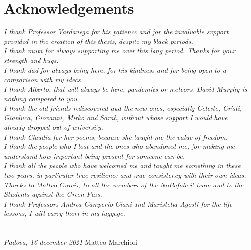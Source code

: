 \cleardoublepage
{}
{}
\chapter*{Acknowledgements\label{sec:acknowledgements}}


\noindent\textit{I thank Professor Vardanega for his patience and for the invaluable support provided in the creation of this thesis, despite my black periods.}\\

\noindent\textit{I thank mum for always supporting me over this long period. Thanks for your strength and hugs.}\\

\noindent\textit{I thank dad for always being here, for his kindness and for being open to a comparison with my ideas.}\\

\noindent\textit{I thank Alberto, that will always be here, pandemics or meteors. David Murphy is nothing compared to you.}\\

\noindent\textit{I thank the old friends rediscovered and the new ones, especially Celeste, Cristi, Gianluca, Giovanni, Mirko and Sarah, without whose support I would have already dropped out of university.}\\

\noindent\textit{I thank Claudia for her poems, because she taught me the value of freedom.}\\

\noindent\textit{I thank the people who I lost and the ones who abandoned me, for making me understand how important being present for someone can be.}\\

\noindent\textit{I thank all the people who have welcomed me and taught me something in these two years, in particular true resilience and true consistency with their own ideas. Thanks to Matteo Gracis, to all the members of the NoBufale.it team and to the Students against the Green Pass.}\\

\noindent\textit{I thank Professors Andrea Camperio Ciani and Maristella Agosti for the life lessons, I will carry them in my luggage.}\\\\\\

\textit{Padova, 16 december 2021}
\hfill Matteo Marchiori